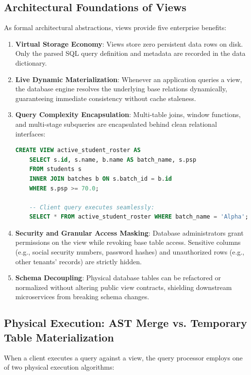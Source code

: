 \documentclass[10pt,twocolumn,letterpaper]{article}
\begin{document}
\subsection{Architectural Foundations of Views}
As formal architectural abstractions, views provide five enterprise benefits:
\begin{enumerate}
    \item \textbf{Virtual Storage Economy}: Views store zero persistent data rows on disk. Only the parsed SQL query definition and metadata are recorded in the data dictionary.
    \item \textbf{Live Dynamic Materialization}: Whenever an application queries a view, the database engine resolves the underlying base relations dynamically, guaranteeing immediate consistency without cache staleness.
    \item \textbf{Query Complexity Encapsulation}: Multi-table joins, window functions, and multi-stage subqueries are encapsulated behind clean relational interfaces:
    \begin{lstlisting}[language=SQL]
    CREATE VIEW active_student_roster AS
    SELECT s.id, s.name, b.name AS batch_name, s.psp
    FROM students s
    INNER JOIN batches b ON s.batch_id = b.id
    WHERE s.psp >= 70.0;
    
    -- Client query executes seamlessly:
    SELECT * FROM active_student_roster WHERE batch_name = 'Alpha';
    \end{lstlisting}
    \item \textbf{Security and Granular Access Masking}: Database administrators grant permissions on the view while revoking base table access. Sensitive columns (e.g., social security numbers, password hashes) and unauthorized rows (e.g., other tenants' records) are strictly hidden.
    \item \textbf{Schema Decoupling}: Physical database tables can be refactored or normalized without altering public view contracts, shielding downstream microservices from breaking schema changes.
\end{enumerate}

\subsection{Physical Execution: AST Merge vs. Temporary Table Materialization}
When a client executes a query against a view, the query processor employs one of two physical execution algorithms:
\end{document}
